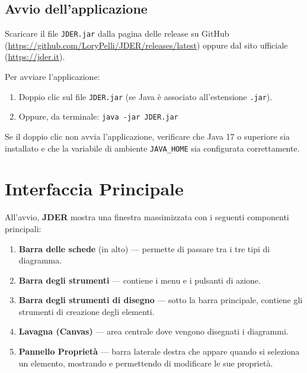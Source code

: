 \documentclass[a4paper,11pt]{article}
\newcommand{\jder}{\textbf{JDER}}
\begin{document}
\subsection{Avvio dell'applicazione}

Scaricare il file \texttt{JDER.jar} dalla pagina delle release su GitHub
(\url{https://github.com/LoryPelli/JDER/releases/latest}) oppure dal sito ufficiale
(\url{https://jder.it}).

Per avviare l'applicazione:
\begin{enumerate}
  \item Doppio clic sul file \texttt{JDER.jar} (se Java è associato all'estensione \texttt{.jar}).
  \item Oppure, da terminale: \texttt{java -jar JDER.jar}
\end{enumerate}

\begin{tcolorbox}[warnbox, title={Attenzione}]
  Se il doppio clic non avvia l'applicazione, verificare che Java 17 o superiore sia installato
  e che la variabile di ambiente \texttt{JAVA\_HOME} sia configurata correttamente.
\end{tcolorbox}

\section{Interfaccia Principale}
\label{sec:interfaccia}

All'avvio, \jder{} mostra una finestra massimizzata con i seguenti componenti principali:

\begin{enumerate}
  \item \textbf{Barra delle schede} (in alto) --- permette di passare tra i tre tipi di diagramma.
  \item \textbf{Barra degli strumenti} --- contiene i menu e i pulsanti di azione.
  \item \textbf{Barra degli strumenti di disegno} --- sotto la barra principale, contiene gli
        strumenti di creazione degli elementi.
  \item \textbf{Lavagna (Canvas)} --- area centrale dove vengono disegnati i diagrammi.
  \item \textbf{Pannello Proprietà} --- barra laterale destra che appare quando si seleziona un
        elemento, mostrando e permettendo di modificare le sue proprietà.
\end{enumerate}
\end{document}
